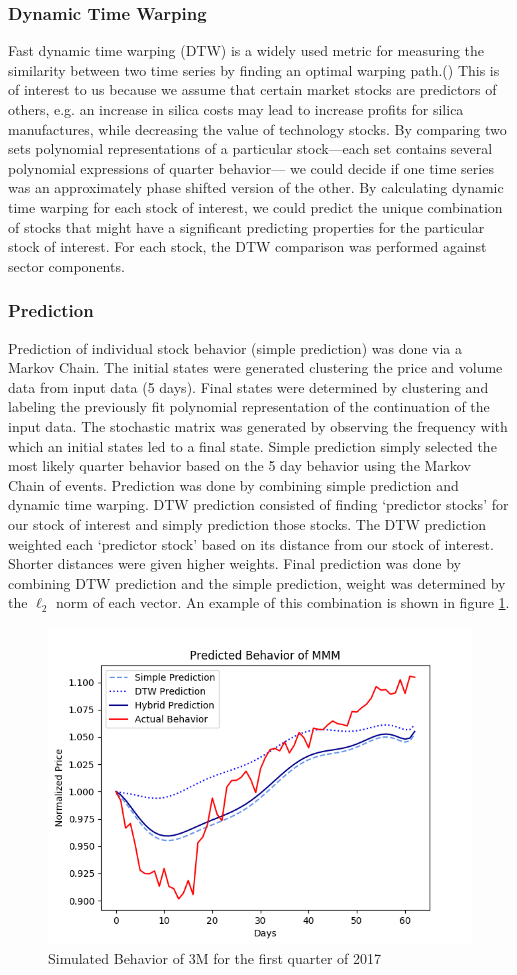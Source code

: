 \documentclass{article}
\begin{document}
\subsubsection{Dynamic Time Warping}
Fast dynamic time warping (DTW) is a widely used metric for measuring the similarity between two time series by finding an optimal warping path.(\cite{salvador}) This is of interest to us because we assume that certain market stocks are predictors of others, e.g.  an increase in silica costs may lead to increase profits for silica manufactures, while decreasing the value of technology stocks. By comparing two sets polynomial representations of a particular stock—each set contains several polynomial expressions of quarter behavior— we could decide if one time series was an approximately phase shifted version of the other. By calculating dynamic time warping for each stock of interest, we could predict the unique combination of stocks that might have a significant predicting properties for the particular stock of interest. For each stock, the DTW comparison was performed against sector components.  
\subsubsection{Prediction}
Prediction of individual stock behavior (simple prediction) was done via a Markov Chain. The initial states were generated clustering the price and volume data from input data (5 days). Final states were determined by clustering and labeling the previously fit polynomial representation of the continuation of the input data.  The stochastic matrix was generated by observing the frequency with which an initial states led to a final state. Simple prediction simply selected the most likely quarter behavior based on the 5 day behavior using the Markov Chain of events. 
Prediction was done by combining simple prediction and dynamic time warping. DTW prediction consisted of finding ‘predictor stocks’ for our stock of interest and simply prediction those stocks. The DTW prediction weighted each ‘predictor stock’ based on its distance from our stock of interest. Shorter distances were given higher weights. Final prediction was done by combining DTW prediction and the simple prediction, weight was determined by the $\ell_2$ norm of each vector. An example of this combination is shown in figure \ref{3m}.
\begin{figure}
    \centering
    \includegraphics[width = .5\textwidth]{4.png}
    \caption{Simulated Behavior of 3M for the first quarter of 2017}
    \label{3m}
\end{figure}
\end{document}
